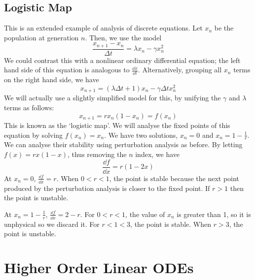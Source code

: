 \documentclass{article}
\begin{document}
\subsection{Logistic Map}
This is an extended example of analysis of discrete equations. Let $x_n$ be the population at generation $n$. Then, we use the model
\[ \frac{x_{n+1} - x_n}{\Delta t} = \lambda x_n - \gamma x_n^2 \]
We could contrast this with a nonlinear ordinary differential equation; the left hand side of this equation is analogous to $\frac{\dd{x}}{\dd{t}}$. Alternatively, grouping all $x_n$ terms on the right hand side, we have
\[ x_{n+1} = (\lambda \Delta t + 1)x_n - \gamma \Delta t x_n^2 \]
We will actually use a slightly simplified model for this, by unifying the $\gamma$ and $\lambda$ terms as follows:
\[ x_{n+1} = r x_n (1 - x_n) = f(x_n) \]
This is known as the `logistic map'. We will analyse the fixed points of this equation by solving $f(x_n) = x_n$. We have two solutions, $x_n = 0$ and $x_n = 1 - \frac{1}{r}$. We can analyse their stability using perturbation analysis as before. By letting $f(x) = rx(1-x)$, thus removing the $n$ index, we have
\[ \frac{\dd{f}}{\dd{x}} = r(1-2x) \]
At $x_n = 0$, $\frac{\dd{f}}{\dd{x}} = r$. When $0 < r < 1$, the point is stable because the next point produced by the perturbation analysis is closer to the fixed point. If $r > 1$ then the point is unstable.

At $x_n = 1 - \frac{1}{r}$, $\frac{\dd{f}}{\dd{x}} = 2 - r$. For $0 < r < 1$, the value of $x_n$ is greater than 1, so it is unphysical so we discard it. For $r < 1 < 3$, the point is stable. When $r > 3$, the point is unstable.

\section{Higher Order Linear ODEs}
\end{document}
